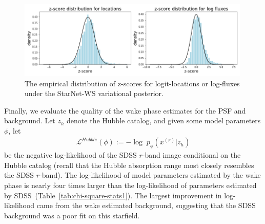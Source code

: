 \begin{figure}[ht]
    \centering
    \includegraphics[width=0.99\textwidth]{figures/z-score_calibration.png}
    \caption{The empirical distribution of z-scores for logit-locations or log-fluxes under the StarNet-WS variational posterior. 
}
    \label{fig:z-score_calibration}
\end{figure}





Finally, we evaluate the quality of the wake phase estimates for the PSF and background. Let $z_h$ denote the Hubble catalog, and given some model parameters $\phi$, let
\begin{align}
    \mathcal{L}^{Hubble}(\phi) := 
    - \log \; p_\phi(x^{(r)} | z_h)
    \label{eq:hubble_neg_loglik}
\end{align}
be the negative log-likelihood of the SDSS $r$-band image conditional on the Hubble catalog (recall that the Hubble absorption range most closely resembles the SDSS $r$-band). The log-likelihood of model parameters estimated by the wake phase is nearly four times larger than the log-likelihood of parameters estimated by SDSS~(Table~\ref{tab:chi-square-stats1}). 
The largest improvement in log-likelihood came from the wake estimated background, suggesting that the SDSS background was a poor fit on this starfield. 

